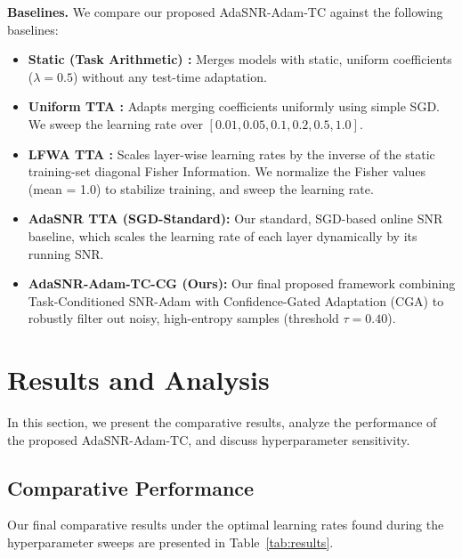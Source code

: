\documentclass{article}
\theoremstyle{plain}
\theoremstyle{definition}
\theoremstyle{remark}
\begin{document}
\textbf{Baselines.} We compare our proposed AdaSNR-Adam-TC against the following baselines:
\begin{itemize}
    \item \textbf{Static (Task Arithmetic) \cite{ilharco22taskvectors}:} Merges models with static, uniform coefficients ($\lambda = 0.5$) without any test-time adaptation.
    \item \textbf{Uniform TTA \cite{yang23adamerging}:} Adapts merging coefficients uniformly using simple SGD. We sweep the learning rate over $[0.01, 0.05, 0.1, 0.2, 0.5, 1.0]$.
    \item \textbf{LFWA TTA \cite{matena22fisher}:} Scales layer-wise learning rates by the inverse of the static training-set diagonal Fisher Information. We normalize the Fisher values (mean = 1.0) to stabilize training, and sweep the learning rate.
    \item \textbf{AdaSNR TTA (SGD-Standard):} Our standard, SGD-based online SNR baseline, which scales the learning rate of each layer dynamically by its running SNR.
    \item \textbf{AdaSNR-Adam-TC-CG (Ours):} Our final proposed framework combining Task-Conditioned SNR-Adam with Confidence-Gated Adaptation (CGA) to robustly filter out noisy, high-entropy samples (threshold $\tau = 0.40$).
\end{itemize}

\section{Results and Analysis}
\label{sec:results}
In this section, we present the comparative results, analyze the performance of the proposed AdaSNR-Adam-TC, and discuss hyperparameter sensitivity.

\subsection{Comparative Performance}
Our final comparative results under the optimal learning rates found during the hyperparameter sweeps are presented in Table~\ref{tab:results}.
\end{document}
